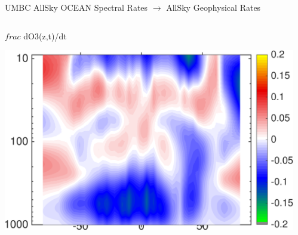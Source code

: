 \documentclass[10pt,t]{beamer}
\begin{document}
\begin{frame}{UMBC AllSky OCEAN Spectral Rates $\rightarrow$ AllSky Geophysical Rates}
\vspace{-0.25in}

\begin{columns}
\begin{column}{0.45\columnwidth}
\begin{block}{\footnotesize $frac$ dO3(z,t)/dt}
\vspace{-0.1in}
\begin{center}
\includegraphics[width=\linewidth]{Figs/CloudAnom/Desc_ocean/o3_lat_p_rates_from_obs_specral_rates.png}
\end{center}
\end{block}
\end{column}

\begin{column}{0.45\columnwidth}

\end{column}
\end{columns}
\end{frame}

\end{document}
